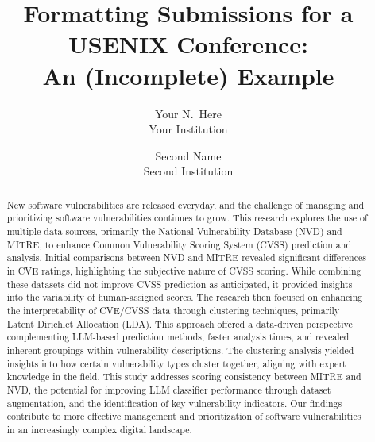 

\date{}

\title{\Large \bf Formatting Submissions for a USENIX Conference:\\
	An (Incomplete) Example}

\author{
	{\rm Your N.\ Here}\\
	Your Institution
	\and
	{\rm Second Name}\\
	Second Institution
} %

\maketitle

\begin{abstract}
	New software vulnerabilities are released everyday, and the challenge of managing and prioritizing software vulnerabilities continues to grow. This research explores the use of multiple data sources, primarily the National Vulnerability Database (NVD) and MITRE, to enhance Common Vulnerability Scoring System (CVSS) prediction and analysis. Initial comparisons between NVD and MITRE revealed significant differences in CVE ratings, highlighting the subjective nature of CVSS scoring. While combining these datasets did not improve CVSS prediction as anticipated, it provided insights into the variability of human-assigned scores. The research then focused on enhancing the interpretability of CVE/CVSS data through clustering techniques, primarily Latent Dirichlet Allocation (LDA). This approach offered a data-driven perspective complementing LLM-based prediction methods, faster analysis times, and revealed inherent groupings within vulnerability descriptions. The clustering analysis yielded insights into how certain vulnerability types cluster together, aligning with expert knowledge in the field. This study addresses scoring consistency between MITRE and NVD, the potential for improving LLM classifier performance through dataset augmentation, and the identification of key vulnerability indicators. Our findings contribute to more effective management and prioritization of software vulnerabilities in an increasingly complex digital landscape.

\end{abstract}


